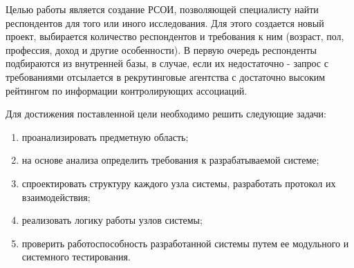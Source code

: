 \Introduction
Целью работы является создание РСОИ, позволяющей специалисту найти респондентов для того или иного исследования. Для этого создается новый проект, выбирается количество  респондентов и требования к ним (возраст, пол, профессия, доход и другие особенности). В первую очередь респонденты подбираются из внутренней базы, в случае, если их недостаточно - запрос с требованиями отсылается в рекрутинговые агентства с достаточно высоким рейтингом по информации контролирующих ассоциаций.

Для достижения поставленной цели необходимо решить следующие задачи:

\begin{enumerate}
\item проанализировать предметную область;
\item на основе анализа определить требования к разрабатываемой системе;
\item спроектировать структуру каждого узла системы, разработать протокол их взаимодействия;
\item реализовать логику работы узлов системы;
\item проверить работоспособность разработанной системы путем ее модульного и системного тестирования.
\end{enumerate}
